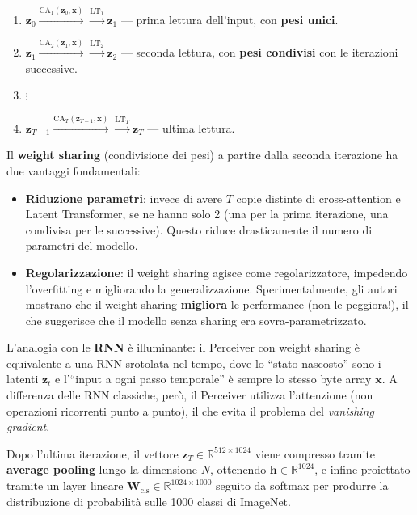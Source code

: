 \documentclass[12pt,a4paper]{article}
\begin{document}
\begin{enumerate}[label=\textbf{Iterazione \arabic*:}, leftmargin=*]
    \item $\mathbf{z}_0 \xrightarrow{\text{CA}_1(\mathbf{z}_0, \mathbf{x})} \xrightarrow{\text{LT}_1} \mathbf{z}_1$ --- prima lettura dell'input, con \textbf{pesi unici}.
    \item $\mathbf{z}_1 \xrightarrow{\text{CA}_2(\mathbf{z}_1, \mathbf{x})} \xrightarrow{\text{LT}_2} \mathbf{z}_2$ --- seconda lettura, con \textbf{pesi condivisi} con le iterazioni successive.
    \item[] $\vdots$
    \item[$T.$] $\mathbf{z}_{T-1} \xrightarrow{\text{CA}_T(\mathbf{z}_{T-1}, \mathbf{x})} \xrightarrow{\text{LT}_T} \mathbf{z}_T$ --- ultima lettura.
\end{enumerate}

Il \textbf{weight sharing} (condivisione dei pesi) a partire dalla seconda iterazione ha due vantaggi fondamentali:
\begin{itemize}[leftmargin=*]
    \item \textbf{Riduzione parametri}: invece di avere $T$ copie distinte di cross-attention e Latent Transformer, se ne hanno solo 2 (una per la prima iterazione, una condivisa per le successive). Questo riduce drasticamente il numero di parametri del modello.
    \item \textbf{Regolarizzazione}: il weight sharing agisce come regolarizzatore, impedendo l'overfitting e migliorando la generalizzazione. Sperimentalmente, gli autori mostrano che il weight sharing \textbf{migliora} le performance (non le peggiora!), il che suggerisce che il modello senza sharing era sovra-parametrizzato.
\end{itemize}

L'analogia con le \textbf{RNN} \`e illuminante: il Perceiver con weight sharing \`e equivalente a una RNN srotolata nel tempo, dove lo ``stato nascosto'' sono i latenti $\mathbf{z}_t$ e l'``input a ogni passo temporale'' \`e sempre lo stesso byte array $\mathbf{x}$. A differenza delle RNN classiche, per\`o, il Perceiver utilizza l'attenzione (non operazioni ricorrenti punto a punto), il che evita il problema del \textit{vanishing gradient}.

Dopo l'ultima iterazione, il vettore $\mathbf{z}_T \in \mathbb{R}^{512 \times 1024}$ viene compresso tramite \textbf{average pooling} lungo la dimensione $N$, ottenendo $\mathbf{h} \in \mathbb{R}^{1024}$, e infine proiettato tramite un layer lineare $\mathbf{W}_{\text{cls}} \in \mathbb{R}^{1024 \times 1000}$ seguito da softmax per produrre la distribuzione di probabilit\`a sulle 1000 classi di ImageNet.
\end{document}
